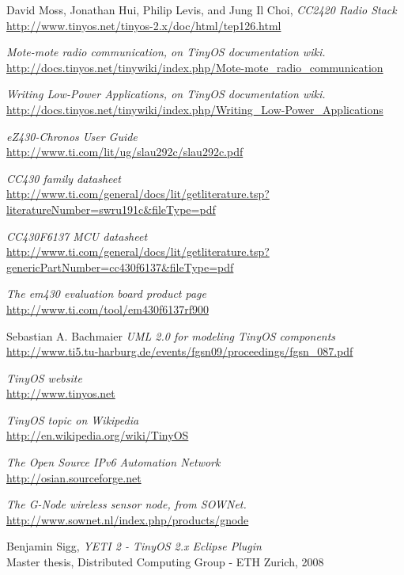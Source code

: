 \begin{thebibliography}{99}
  David Moss, Jonathan Hui, Philip Levis, and Jung Il Choi,
  \textit{CC2420 Radio Stack} \\
  \url{http://www.tinyos.net/tinyos-2.x/doc/html/tep126.html}

  \textit{Mote-mote radio communication, on TinyOS documentation wiki.} \\
  \url{http://docs.tinyos.net/tinywiki/index.php/Mote-mote_radio_communication}

  \textit{Writing Low-Power Applications, on TinyOS documentation wiki.} \\
  \url{http://docs.tinyos.net/tinywiki/index.php/Writing_Low-Power_Applications}

  \textit{eZ430-Chronos User Guide} \\
  \url{http://www.ti.com/lit/ug/slau292c/slau292c.pdf}

  \textit{CC430 family datasheet}\\
  \url{http://www.ti.com/general/docs/lit/getliterature.tsp?literatureNumber=swru191c&fileType=pdf}

  \textit{CC430F6137 MCU datasheet} \\
  \url{http://www.ti.com/general/docs/lit/getliterature.tsp?genericPartNumber=cc430f6137&fileType=pdf}

  \textit{The em430 evaluation board product page} \\
  \url{http://www.ti.com/tool/em430f6137rf900}

  Sebastian A. Bachmaier
  \textit{UML 2.0 for modeling TinyOS components} \\
  \url{http://www.ti5.tu-harburg.de/events/fgsn09/proceedings/fgsn_087.pdf}

  \textit{TinyOS website} \\
  \url{http://www.tinyos.net}

  \textit{TinyOS topic on Wikipedia} \\
  \url{http://en.wikipedia.org/wiki/TinyOS}

  \textit{The Open Source IPv6 Automation Network} \\
  \url{http://osian.sourceforge.net}

  \textit{The G-Node wireless sensor node, from SOWNet.} \\
  \url{http://www.sownet.nl/index.php/products/gnode}

  Benjamin Sigg, \textit{YETI 2 - TinyOS 2.x Eclipse Plugin} \\
  Master thesis, Distributed Computing Group - ETH Zurich, 2008

\end{thebibliography}
